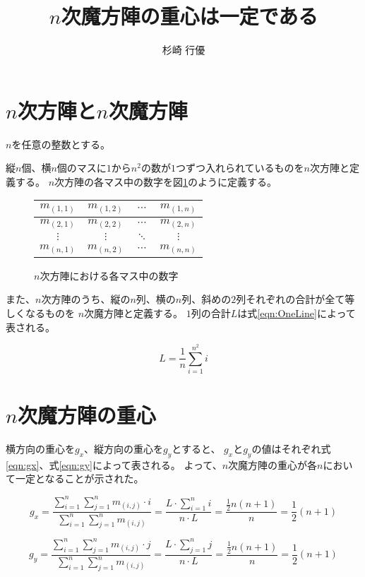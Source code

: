 \documentclass[a4paper]{jsarticle}
\title{$n$次魔方陣の重心は一定である}
\author{杉崎 行優}
\date{}
\begin{document}
\maketitle
{}

\thispagestyle{empty}

\section{$n$次方陣と$n$次魔方陣}

$n$を任意の整数とする。

縦$n$個、横$n$個のマスに$1$から$n^2$の数が$1$つずつ入れられているものを$n$次方陣と定義する。
$n$次方陣の各マス中の数字を図\ref{tab:square}のように定義する。

\begin{figure}[htb]
\begin{center}
\begin{tabular}{|c|c|c|c|}
\hline
$m_{(1,1)}$ & $m_{(1,2)}$ & $\cdots$ & $m_{(1,n)}$ \\\hline
$m_{(2,1)}$ & $m_{(2,2)}$ & $\cdots$ & $m_{(2,n)}$ \\\hline
$\vdots$ & $\vdots$ & $\ddots$ & $\vdots$ \\\hline
$m_{(n,1)}$ & $m_{(n,2)}$ & $\cdots$ & $m_{(n,n)}$ \\\hline
\end{tabular}
\end{center}
\caption{$n$次方陣における各マス中の数字}
\label{tab:square}
\end{figure}

また、$n$次方陣のうち、縦の$n$列、横の$n$列、斜めの$2$列それぞれの合計が全て等しくなるものを
$n$次魔方陣と定義する。
$1$列の合計$L$は式\ref{eqn:OneLine}によって表される。

\begin{equation}
L=\frac{1}{n}\sum_{i=1}^{n^2}i
\label{eqn:OneLine}
\end{equation}

\section{$n$次魔方陣の重心}

横方向の重心を$g_x$、縦方向の重心を$g_y$とすると、
$g_x$と$g_y$の値はそれぞれ式\ref{eqn:gx}、式\ref{eqn:gy}によって表される。
よって、$n$次魔方陣の重心が各$n$において一定となることが示された。

\begin{equation} \label{eqn:gx}
\displaystyle
g_x = \frac{\displaystyle \sum_{i=1}^n \sum_{j=1}^n m_{(i,j)} \cdot i}{\displaystyle \sum_{i=1}^n \sum_{j=1}^n m_{(i,j)}}
=\frac{\displaystyle L \cdot \sum_{i=1}^n i}{n \cdot L}
=\frac{\displaystyle \frac{1}{2} n (n+1)}{n}
=\frac{1}{2} (n+1)
\end{equation}

\begin{equation} \label{eqn:gy}
\displaystyle
g_y = \frac{\displaystyle \sum_{i=1}^n \sum_{j=1}^n m_{(i,j)} \cdot j}{\displaystyle \sum_{i=1}^n \sum_{j=1}^n m_{(i,j)}}
=\frac{\displaystyle L \cdot \sum_{j=1}^n j}{n \cdot L}
=\frac{\displaystyle \frac{1}{2} n (n+1)}{n}
=\frac{1}{2} (n+1)
\end{equation}
\end{document}
